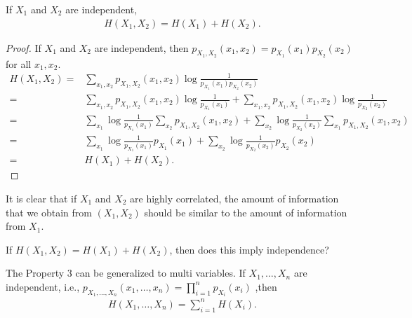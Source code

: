 \documentclass{article}
\begin{document}
\begin{theorem}
    If $X_1$ and $X_2$ are independent,
    \begin{align}
        H(X_1, X_2) = H(X_1) + H(X_2).
    \end{align}
\end{theorem}
\begin{proof}
If $X_1$ and $X_2$ are independent, then $p_{X_1, X_2} (x_1, x_2) = p_{X_1}(x_1) p_{X_2}(x_2)$ for all $x_1, x_2$.
\begin{align}
    H(X_1, X_2) =& \sum_{x_1, x_2} p_{X_1, X_2} (x_1, x_2) \log \frac{1}{p_{X_1}(x_1)p_{X_2}(x_2)}\\
    =& \sum_{x_1, x_2} p_{X_1, X_2} (x_1, x_2) \log \frac{1}{p_{X_1}(x_1)}
    + \sum_{x_1, x_2} p_{X_1, X_2} (x_1, x_2) \log \frac{1}{p_{X_2}(x_2)}\\
    =& \sum_{x_1}  \log \frac{1}{p_{X_1}(x_1)}\sum_{x_2}p_{X_1, X_2} (x_1, x_2)
    + \sum_{x_2} \log \frac{1}{p_{X_2}(x_2)}\sum_{x_1} p_{X_1, X_2} (x_1, x_2) \\
    =& \sum_{x_1}  \log \frac{1}{p_{X_1}(x_1)} p_{X_1} (x_1)
    + \sum_{x_2} \log \frac{1}{p_{X_2}(x_2)} p_{X_2} (x_2) \\
    =& H(X_1)+H(X_2).
\end{align}
\end{proof}
It is clear that if $X_1$ and $X_2$ are highly correlated,
the amount of information that we obtain from $(X_1, X_2)$ should be similar to
the amount of information from $X_1$.

\begin{exercise}
    If $H(X_1, X_2)=H(X_1) +H(X_2)$, then does this imply independence?
\end{exercise}

The Property 3 can be generalized to multi variables.
If $X_1, \dots, X_n$ are independent, i.e., $p_{X_1,\dots, X_n}(x_1,\dots, x_n) = \prod_{i=1}^n p_{X_i}(x_i)$ ,then
\begin{align}
    H(X_1,\dots, X_n) = \sum_{i=1}^n H(X_i). 
\end{align}
\end{document}

